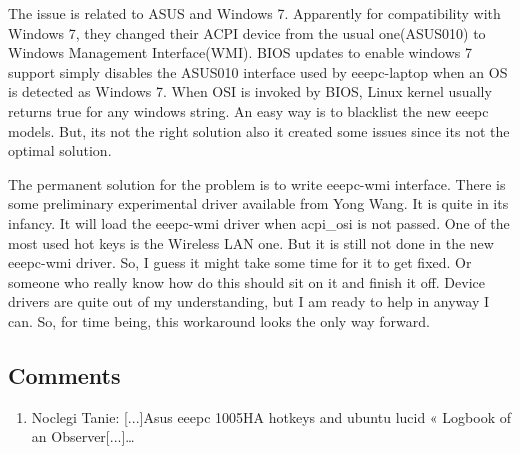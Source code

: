 The issue is related to ASUS and Windows 7. Apparently for compatibility 
with Windows 7, they changed their ACPI device from the usual one(ASUS010)
to Windows Management Interface(WMI). BIOS updates to enable windows 7 
support simply disables the ASUS010 interface used by eeepc-laptop when an 
OS is detected as Windows 7. When OSI is invoked by BIOS, Linux kernel usually
returns true for any windows string. An easy way is to blacklist the new eeepc
models. But, its not the right solution also it created some issues since its not the optimal solution.

The permanent solution for the problem is to write eeepc-wmi interface. There 
is some preliminary experimental driver available from Yong Wang. It is quite in
its infancy. It will load the eeepc-wmi driver when acpi\_osi is not passed.
One of the most used hot keys is the Wireless LAN one. But it is still not done in 
the new eeepc-wmi driver. So, I guess it might take some time for it to get fixed. Or someone 
who really know how do this should sit on it and finish it off. Device drivers are quite out
of my understanding, but I am ready to help in anyway I can. So, for time being, this workaround
looks the only way forward.

\subsection{Comments}
\begin{enumerate}
 \item Noclegi Tanie: 
[...]Asus eeepc 1005HA hotkeys and ubuntu lucid « Logbook of an Observer[...]…
\end{enumerate}

\newpage 